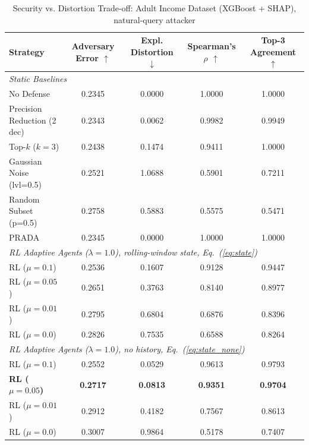 \documentclass[conference]{IEEEtran}
\DeclareRobustCommand{\rev}[1]{#1}
\DeclareRobustCommand{\revnew}[1]{#1}
\begin{document}
\begin{table}[t]
\caption{Security vs. Distortion Trade-off: Adult Income Dataset (XGBoost + SHAP)\rev{, natural-query attacker}}
\begin{center}
{\footnotesize
\begin{tabular}{lcccc}
\toprule
\textbf{Strategy} & \textbf{\rev{Adversary Error} $\uparrow$} & \textbf{\rev{Expl. Distortion} $\downarrow$} & \textbf{Spearman's $\rho$ $\uparrow$} & \textbf{Top-3 Agreement $\uparrow$} \\
\midrule
\multicolumn{5}{l}{\textit{Static Baselines}} \\
\rev{No Defense} & \rev{0.2345} & \rev{0.0000} & \rev{1.0000} & \rev{1.0000} \\
\rev{Precision Reduction (2 dec)} & \rev{0.2343} & \rev{0.0062} & \rev{0.9982} & \rev{0.9949} \\
\rev{Top-$k$ ($k=3$)} & \rev{0.2438} & \rev{0.1474} & \rev{0.9411} & \rev{1.0000} \\
\rev{Gaussian Noise (lvl=0.5)} & \rev{0.2521} & \rev{1.0688} & \rev{0.5901} & \rev{0.7211} \\
\rev{Random Subset (p=0.5)} & \rev{0.2758} & \rev{0.5883} & \rev{0.5575} & \rev{0.5471} \\
\rev{PRADA \cite{b17}} & \rev{0.2345} & \rev{0.0000} & \rev{1.0000} & \rev{1.0000} \\
\midrule
\multicolumn{5}{l}{\textit{RL Adaptive Agents ($\lambda=1.0$)\rev{, rolling-window state\revnew{, Eq.~(\ref{eq:state})}}}} \\
\rev{RL ($\mu = 0.1$)} & \rev{0.2536} & \rev{0.1607} & \rev{0.9128} & \rev{0.9447} \\
\rev{RL ($\mu = 0.05$)} & \rev{0.2651} & \rev{0.3763} & \rev{0.8140} & \rev{0.8977} \\
\rev{RL ($\mu = 0.01$)} & \rev{0.2795} & \rev{0.6804} & \rev{0.6876} & \rev{0.8396} \\
\rev{RL ($\mu = 0.0$)} & \rev{0.2826} & \rev{0.7535} & \rev{0.6588} & \rev{0.8264} \\
\midrule
\multicolumn{5}{l}{\rev{\textit{RL Adaptive Agents ($\lambda=1.0$), no history\revnew{, Eq.~(\ref{eq:state_none})}}}} \\
\rev{RL ($\mu = 0.1$)} & \rev{0.2552} & \rev{0.0529} & \rev{0.9613} & \rev{0.9793} \\
\rev{\textbf{RL ($\mu = 0.05$)}} & \rev{\textbf{0.2717}} & \rev{\textbf{0.0813}} & \rev{\textbf{0.9351}} & \rev{\textbf{0.9704}} \\
\rev{RL ($\mu = 0.01$)} & \rev{0.2912} & \rev{0.4182} & \rev{0.7567} & \rev{0.8613} \\
\rev{RL ($\mu = 0.0$)} & \rev{0.3007} & \rev{0.9864} & \rev{0.5178} & \rev{0.7407} \\
\bottomrule
\end{tabular}
}
\label{tab_adult}
\end{center}
\end{table}
\end{document}
